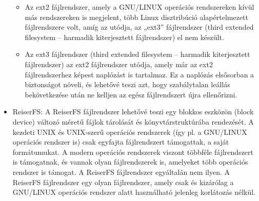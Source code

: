 \documentclass[margin=0px]{article}
\begin{document}
\begin{itemize}
\begin{itemize}
			\item Az ext2 fájlrendszer, amely a GNU/LINUX operációs rendszereken kívül más rendszereken is megjelent, több Linux disztribúció alapértelmezett fájlrendszere volt, amíg az utódja, az „ext3” fájlrendszer (third extended filesystem – harmadik kiterjesztett fájlrendszer) el nem készült.
			\item Az ext3 fájlrendszer (third extended filesystem – harmadik kiterjesztett fájlrendszer) az ext2 fájlrendszer utódja, amely már az ext2 fájlrendszerhez képest naplózást is tartalmaz. Ez a naplózás elsősorban a biztonságot növeli, és lehetővé teszi azt, hogy szabálytalan leállás bekövetkezése után ne kelljen az egész fájlrendszert újra ellenőrizni.
		\end{itemize}
		\item ReiserFS: A ReiserFS fájlrendszer lehetővé teszi egy blokkos eszközön (block device) változó méretű fájlok tárolását és könyvtárstruktúrába rendezését. A kezdeti UNIX és UNIX-szerű operációs rendszerek (így pl. a GNU/LINUX operációs rendszer is) csak egyfajta fájlrendszert támogattak, a saját formátumukat. A modern operációs rendszerek viszont többféle fájlrendszert is támogatnak, és vannak olyan fájlrendszerek is, amelyeket több operációs rendszer is támogat. A ReiserFS fájlrendszer egyáltalán nem ilyen. A ReiserFS fájlrendszer egy olyan fájlrendszer, amely csak és kizárólag a GNU/LINUX operációs rendszer alatt használható jelenleg korlátozás nélkül.
	\end{itemize}
	
\end{document}
